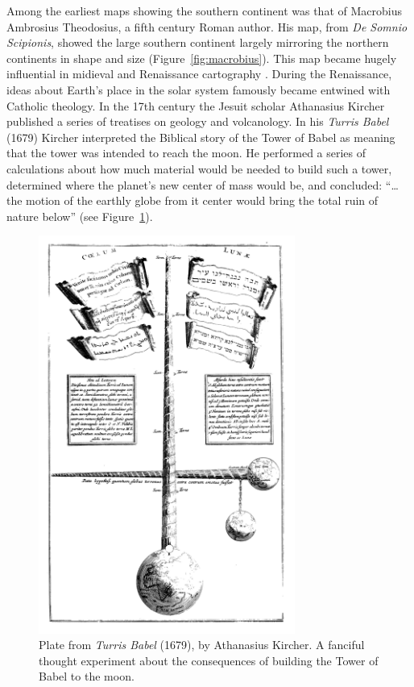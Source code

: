 Among the earliest maps showing the southern continent was that of Macrobius Ambrosius Theodosius, a fifth
century Roman author. His map, from \emph{De Somnio Scipionis}, showed the large southern continent
largely mirroring the northern continents in shape and size (Figure~\ref{fig:macrobius}).
This map became hugely influential in midieval and Renaissance cartography \citep{stahl1942astronomy}.
During the Renaissance, ideas about Earth's place in the solar system famously became
entwined with Catholic theology. In the 17th century the Jesuit scholar Athanasius Kircher
published a series of treatises on geology and volcanology. In his \emph{Turris Babel} (1679)
Kircher interpreted the Biblical story of the Tower of Babel as meaning that 
the tower was intended to reach the moon. He performed a series of calculations
about how much material would be needed to build such a tower, determined where the planet's new
center of mass would be, and concluded:
``\ldots the motion of the earthly globe from it center would bring the total ruin of nature below'' (see Figure~\ref{fig:turris_babel}).

\begin{figure}
\centering
\includegraphics[width=0.75\textwidth]{intro/figures/turris_babel.jpg}
\caption[Plate from \emph{Turris Babel} (1679), by Athanasius Kircher.]{Plate from \emph{Turris Babel} (1679), by Athanasius Kircher.
A fanciful thought experiment about the consequences of building the Tower of Babel to the moon.}
\label{fig:turris_babel}
\end{figure}

